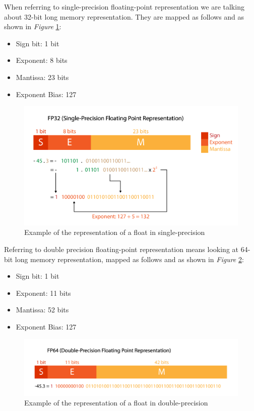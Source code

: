 When referring to single-precision floating-point representation we are talking about 32-bit long memory representation. They are mapped as follows and as shown in \emph{Figure} \ref{fig:FP32}:
\begin{itemize}
  \item Sign bit: 1 bit
  \item Exponent: 8 bits
  \item Mantissa: 23 bits
  \item Exponent Bias: 127
\end{itemize}

\begin{figure}[htbp]
	\centering
		\includegraphics[width=.8\textwidth]{Figures/FP32.png}
	\caption[Single-precision float representation]{Example of the representation of a float in single-precision}
	\label{fig:FP32}
\end{figure}


Referring to double precision floating-point representation means looking at 64-bit long memory representation, mapped as follows and as shown in \emph{Figure} \ref{fig:FP64}:
\begin{itemize}
  \item Sign bit: 1 bit
  \item Exponent: 11 bits
  \item Mantissa: 52 bits
  \item Exponent Bias: 127
\end{itemize}

\begin{figure}[htbp]
	\centering
		\includegraphics[width=.8\textwidth]{Figures/FP64.png}
	\caption[Double-precision float representation]{Example of the representation of a float in double-precision}
	\label{fig:FP64}
\end{figure}

